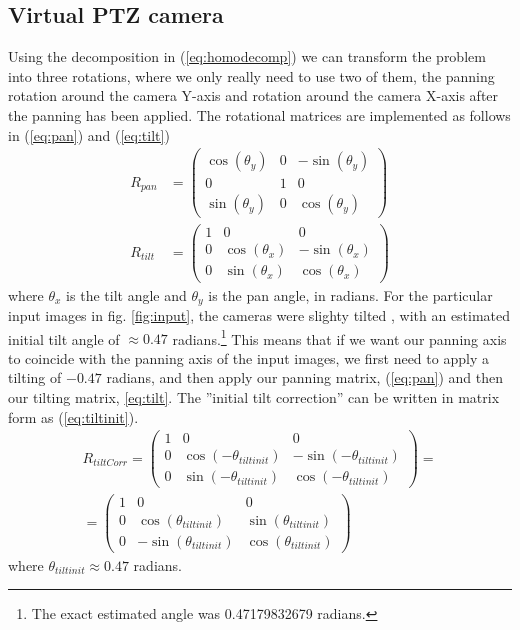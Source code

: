 \subsection{Virtual PTZ camera}
Using the decomposition in (\ref{eq:homodecomp}) we can transform the problem into three rotations, where we only really need to use two of them, the panning rotation around the camera Y-axis and rotation around the camera X-axis after the panning has been applied.
The rotational matrices are implemented as follows in (\ref{eq:pan}) and (\ref{eq:tilt})
	\begin{align}		
		R_{pan}&=\begin{pmatrix} 
			\cos(\theta_y) & 0 & -\sin(\theta_y) \\
			0 & 1 & 0 \\
			\sin(\theta_y) & 0 & \cos(\theta_y)
		\end{pmatrix} \label{eq:pan} \\
		R_{tilt} &=\begin{pmatrix}
			1 & 0 & 0 \\
			0 & \cos(\theta_x) & -\sin(\theta_x) \\
			0 & \sin(\theta_x) & \cos(\theta_x)
		\end{pmatrix} \label{eq:tilt}
	\end{align}
	where $\theta_x$ is the tilt angle and $\theta_y$ is the pan angle, in radians.
	For the particular input images in fig. \ref{fig:input}, the cameras were slighty tilted , with an estimated initial tilt angle of $\approx 0.47$ radians.\footnote{The exact estimated angle was 0.47179832679 radians.}
	This means that if we want our panning axis to coincide with the panning axis of the input images, we first need to apply a tilting of $-0.47$ radians, and then apply our panning matrix, (\ref{eq:pan}) and then our tilting matrix, \ref{eq:tilt}. 
	The ''initial tilt correction'' can be written in matrix form as (\ref{eq:tiltinit}).
	\begin{multline}
		R_{tiltCorr}=\begin{pmatrix}
			1 & 0 & 0 \\
			0 & \cos(-\theta_{tiltinit}) & -\sin(-\theta_{tiltinit}) \\
			0 & \sin(-\theta_{tiltinit}) & \cos(-\theta_{tiltinit})
		\end{pmatrix} = \\
		=\begin{pmatrix}
			1 & 0 & 0 \\
			0 & \cos(\theta_{tiltinit}) & \sin(\theta_{tiltinit}) \\
			0 & -\sin(\theta_{tiltinit}) & \cos(\theta_{tiltinit})
		\end{pmatrix}
		\label{eq:tiltinit}
	\end{multline}
	where $\theta_{tiltinit} \approx 0.47$ radians.

